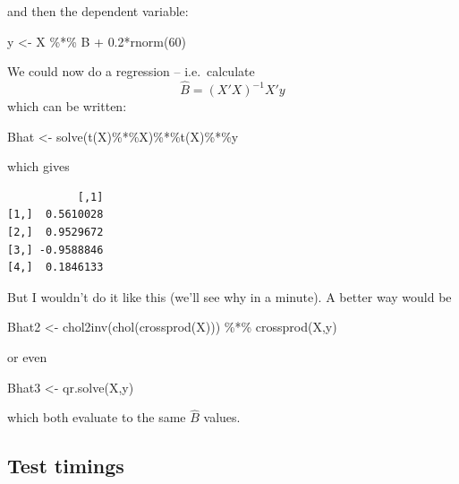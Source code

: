 \documentclass[
  letterpaper,
]{book}
\newenvironment{Shaded}{\begin{snugshade}}{\end{snugshade}}
\newcommand{\DecValTok}[1]{\textcolor[rgb]{0.68,0.00,0.00}{#1}}
\newcommand{\FloatTok}[1]{\textcolor[rgb]{0.68,0.00,0.00}{#1}}
\newcommand{\FunctionTok}[1]{\textcolor[rgb]{0.28,0.35,0.67}{#1}}
\newcommand{\NormalTok}[1]{\textcolor[rgb]{0.00,0.23,0.31}{#1}}
\newcommand{\OtherTok}[1]{\textcolor[rgb]{0.00,0.23,0.31}{#1}}
\newcommand{\SpecialCharTok}[1]{\textcolor[rgb]{0.37,0.37,0.37}{#1}}
\begin{document}
and then the dependent variable:

\begin{Shaded}
\begin{Highlighting}[]
\NormalTok{y }\OtherTok{\textless{}{-}}\NormalTok{ X }\SpecialCharTok{\%*\%}\NormalTok{ B }\SpecialCharTok{+} \FloatTok{0.2}\SpecialCharTok{*}\FunctionTok{rnorm}\NormalTok{(}\DecValTok{60}\NormalTok{)}
\end{Highlighting}
\end{Shaded}

We could now do a regression -- i.e.~calculate \[
  \hat B = (X'X)^{-1}X'y
\] which can be written:

\begin{Shaded}
\begin{Highlighting}[]
\NormalTok{Bhat }\OtherTok{\textless{}{-}} \FunctionTok{solve}\NormalTok{(}\FunctionTok{t}\NormalTok{(X)}\SpecialCharTok{\%*\%}\NormalTok{X)}\SpecialCharTok{\%*\%}\FunctionTok{t}\NormalTok{(X)}\SpecialCharTok{\%*\%}\NormalTok{y}
\end{Highlighting}
\end{Shaded}

which gives

\begin{verbatim}
           [,1]
[1,]  0.5610028
[2,]  0.9529672
[3,] -0.9588846
[4,]  0.1846133
\end{verbatim}

But I wouldn't do it like this (we'll see why in a minute). A better way
would be

\begin{Shaded}
\begin{Highlighting}[]
\NormalTok{Bhat2 }\OtherTok{\textless{}{-}} \FunctionTok{chol2inv}\NormalTok{(}\FunctionTok{chol}\NormalTok{(}\FunctionTok{crossprod}\NormalTok{(X))) }\SpecialCharTok{\%*\%} \FunctionTok{crossprod}\NormalTok{(X,y)}
\end{Highlighting}
\end{Shaded}

or even

\begin{Shaded}
\begin{Highlighting}[]
\NormalTok{Bhat3 }\OtherTok{\textless{}{-}} \FunctionTok{qr.solve}\NormalTok{(X,y)}
\end{Highlighting}
\end{Shaded}

which both evaluate to the same \(\hat B\) values.

\hypertarget{test-timings}{%
\subsection{Test timings}\label{test-timings}}
\end{document}
